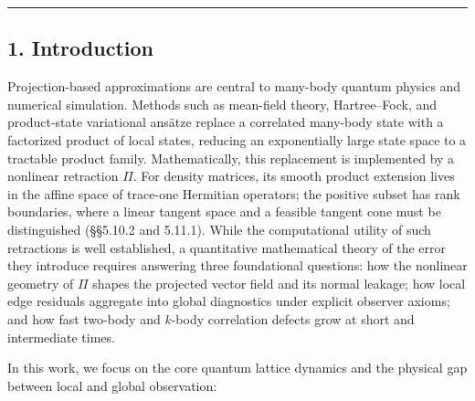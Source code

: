 \documentclass[
  11pt,
]{article}
\begin{document}
\begin{center}\rule{0.5\linewidth}{0.5pt}\end{center}

\subsection{1. Introduction}\label{introduction}

Projection-based approximations are central to many-body quantum physics and numerical simulation. Methods such as mean-field theory, Hartree--Fock, and product-state variational ansätze replace a correlated many-body state with a factorized product of local states, reducing an exponentially large state space to a tractable product family. Mathematically, this replacement is implemented by a nonlinear retraction \(\Pi\). For density matrices, its smooth product extension lives in the affine space of trace-one Hermitian operators; the positive subset has rank boundaries, where a linear tangent space and a feasible tangent cone must be distinguished (§§5.10.2 and 5.11.1). While the computational utility of such retractions is well established, a quantitative mathematical theory of the error they introduce requires answering three foundational questions: how the nonlinear geometry of \(\Pi\) shapes the projected vector field and its normal leakage; how local edge residuals aggregate into global diagnostics under explicit observer axioms; and how fast two-body and \(k\)-body correlation defects grow at short and intermediate times.

In this work, we focus on the core quantum lattice dynamics and the physical gap between local and global observation:
\end{document}
